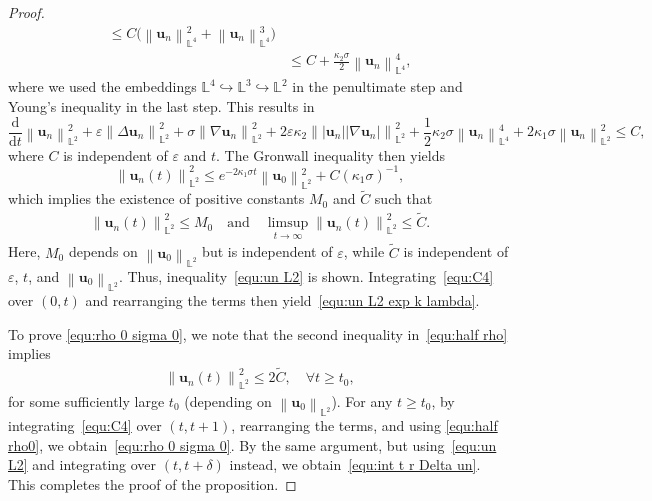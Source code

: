 \documentclass[11pt, reqno]{amsart}
\theoremstyle{definition}
\numberwithin{equation}{section}
\newcommand{\bff}{\boldsymbol}
\newcommand{\bb}{\mathbb}
\newcommand{\ddt}{\frac{\mathrm{d}}{\mathrm{d}t}}
\newcommand{\norm}[2]{\left\|{#1}\right\|_{#2}}
\begin{document}
\begin{proof}
\begin{align*}
            \leq
            C\Big(\norm{\bff{u}_n}{\bb{L}^4}^2+\norm{\bff{u}_n}{\bb{L}^4}^3\Big)
        	\\
        	&\leq
            C + \frac{\kappa_2\sigma}{2} \norm{\bff{u}_n}{\bb{L}^4}^4,
        \end{align*}
        where we used the embeddings $\bb{L}^4\hookrightarrow\bb{L}^3\hookrightarrow \bb{L}^2$ in the penultimate step and Young's inequality in the last step. This results in
    \begin{equation}\label{equ:C4}
    \ddt \norm{\bff{u}_n}{\bb{L}^2}^2
		+
		\varepsilon \norm{\Delta \bff{u}_n}{\bb{L}^2}^2
		+
		\sigma \norm{\nabla \bff{u}_n}{\bb{L}^2}^2
		+
		2\varepsilon \kappa_2 \norm{|\bff{u}_n| |\nabla \bff{u}_n|}{\bb{L}^2}^2
		+
		\frac12 \kappa_2 \sigma \norm{\bff{u}_n}{\bb{L}^4}^4 
		+
		2\kappa_1 \sigma \norm{\bff{u}_n}{\bb{L}^2}^2
        \leq
        C, %
    \end{equation}
    where ${C}$ is independent of $\varepsilon$ and $t$.
    The Gronwall inequality then yields
    \begin{equation*}
        \norm{\bff{u}_n(t)}{\bb{L}^2}^2
        \leq
        e^{-2\kappa_1 \sigma t} \norm{\bff{u}_0}{\bb{L}^2}^2
        +
        C(\kappa_1\sigma)^{-1},
    \end{equation*}
    which implies the existence of positive constants $M_0$ and $\widetilde{C}$ such that
	\begin{align}\label{equ:half rho}
		\norm{\bff{u}_n(t)}{\bb{L}^2}^2 
		\leq
        M_0
		\quad
		\text{and}
		\quad
		\limsup_{t\to \infty} \norm{\bff{u}_n(t)}{\bb{L}^2}^2 
		\leq
		\widetilde{C}.
	\end{align}
    Here, $M_0$ depends on $\norm{\bff{u}_0}{\bb{L}^2}$ but is independent of $\varepsilon$, while $\widetilde{C}$ is independent of $\varepsilon$, $t$, and $\norm{\bff{u}_0}{\bb{L}^2}$. Thus, inequality~\eqref{equ:un L2} is shown. Integrating~\eqref{equ:C4} over $(0,t)$ and rearranging the terms then yield~\eqref{equ:un L2 exp k lambda}.

    To prove \eqref{equ:rho 0 sigma 0}, we note that the second inequality in~\eqref{equ:half rho} implies
	\begin{align}\label{equ:half rho0}
		\norm{\bff{u}_n(t)}{\bb{L}^2}^2 
		\leq
		2\widetilde{C}, \quad \forall t \geq t_0,
	\end{align}
	for some sufficiently large $t_0$ (depending on $\norm{\bff{u}_0}{\bb{L}^2}$).
	For any $t\ge t_0$, by integrating~\eqref{equ:C4} over
	$(t,t+1)$, rearranging the terms, and using \eqref{equ:half rho0}, we obtain~\eqref{equ:rho 0 sigma 0}. By the same argument, but using~\eqref{equ:un L2} and integrating over $(t,t+\delta)$ instead, we obtain~\eqref{equ:int t r Delta un}. This completes the proof of the proposition.
\end{proof}
\end{document}
